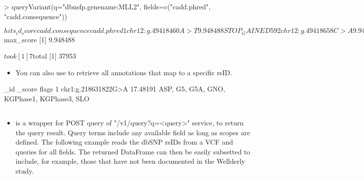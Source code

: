 \documentclass[12pt]{article}
\begin{document}
\begin{Schunk}
\begin{Sinput}
> queryVariant(q="dbnsfp.genename:MLL2", fields=c("cadd.phred", "cadd.consequence"))
\end{Sinput}
\begin{Soutput}
$hits
                   _id   _score cadd.consequence cadd.phred
1  chr12:g.49418460A>T 9.948488      STOP_GAINED         59
2  chr12:g.49418658C>A 9.948488      STOP_GAINED         57
3  chr12:g.49420281G>T 9.948488      STOP_GAINED         59
4  chr12:g.49420340T>A 9.948488      STOP_GAINED         53
5  chr12:g.49420364T>A 9.948488      STOP_GAINED         53
6  chr12:g.49420844C>A 9.948488      STOP_GAINED         53
7  chr12:g.49420888G>C 9.948488      STOP_GAINED         53
8  chr12:g.49421602A>T 9.948488      STOP_GAINED         53
9  chr12:g.49421807C>A 9.948488      STOP_GAINED         57
10 chr12:g.49422661T>A 9.948488      STOP_GAINED         45

$max_score
[1] 9.948488

$took
[1] 7

$total
[1] 37953
\end{Soutput}
\end{Schunk}

\begin{itemize}
\item You can also use  to retrieve all annotations that map to a specific rsID.
\end{itemize}

\begin{Schunk}
\begin{Soutput}
                  _id   _score                                      flags
1 chr1:g.218631822G>A 17.48191 ASP, G5, G5A, GNO, KGPhase1, KGPhase3, SLO
\end{Soutput}
\end{Schunk}

\subsection{}

\begin{itemize}
\item {} is a wrapper for POST query of "/v1/query?q=<query>" service, to return  the query result. Query terms include any available field as long as scopes are defined. The following example reads the dbSNP rsIDs from a VCF and queries for all fields. The returned DataFrame can then be easily subsetted to include, for example, those that have not been documented in the Wellderly study.
\end{itemize}
\end{document}
